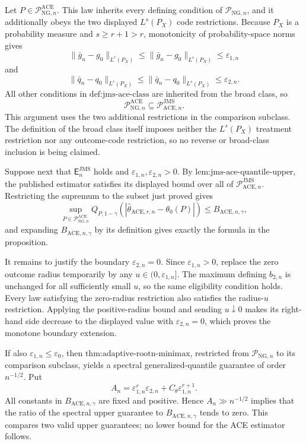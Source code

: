 Let \(P\in\mathcal P_{\mathrm{NG},n}^{\mathrm{ACE}}\).  This law inherits every defining condition of \(\mathcal P_{\mathrm{NG},n}\), and it additionally obeys the two displayed \(L^s(P_X)\) code restrictions.  Because \(P_X\) is a probability measure and \(s\ge r+1>r\), monotonicity of probability-space norms gives
\[
 \|\bar g_n-g_0\|_{L^r(P_X)}
 \le\|\bar g_n-g_0\|_{L^s(P_X)}
 \le\varepsilon_{1,n}
\]
and
\[
 \|\bar q_n-q_0\|_{L^r(P_X)}
 \le\|\bar q_n-q_0\|_{L^s(P_X)}
 \le\varepsilon_{2,n}.
\]
All other conditions in \(\text{def:jms-ace-class}\) are inherited from the broad class, so
\[
 \mathcal P_{\mathrm{NG},n}^{\mathrm{ACE}}
 \subseteq\mathcal P_{\mathrm{ACE},n}^{\mathrm{JMS}}.
\]
This argument uses the two additional restrictions in the comparison subclass.  The definition of the broad class itself imposes neither the \(L^s(P_X)\) treatment restriction nor any outcome-code restriction, so no reverse or broad-class inclusion is being claimed.

Suppose next that \(\mathsf E_n^{\mathrm{JMS}}\) holds and \(\varepsilon_{1,n},\varepsilon_{2,n}>0\).  By \(\text{lem:jms-ace-quantile-upper}\), the published estimator satisfies its displayed bound over all of \(\mathcal P_{\mathrm{ACE},n}^{\mathrm{JMS}}\).  Restricting the supremum to the subset just proved gives
\[
 \sup_{P\in\mathcal P_{\mathrm{NG},n}^{\mathrm{ACE}}}
 Q_{P,1-\gamma}(|\widehat\theta_{\mathrm{ACE},r,n}-\theta_0(P)|)
 \le B_{\mathrm{ACE},n,\gamma},
\]
and expanding \(B_{\mathrm{ACE},n,\gamma}\) by its definition gives exactly the formula in the proposition.

It remains to justify the boundary \(\varepsilon_{2,n}=0\).  Since \(\varepsilon_{1,n}>0\), replace the zero outcome radius temporarily by any \(u\in(0,\varepsilon_{1,n}]\).  The maximum defining \(b_{2,n}\) is unchanged for all sufficiently small \(u\), so the same eligibility condition holds.  Every law satisfying the zero-radius restriction also satisfies the radius-\(u\) restriction.  Applying the positive-radius bound and sending \(u\downarrow0\) makes its right-hand side decrease to the displayed value with \(\varepsilon_{2,n}=0\), which proves the monotone boundary extension.

If also \(\varepsilon_{1,n}\le\varepsilon_0\), then \(\text{thm:adaptive-rootn-minimax}\), restricted from \(\mathcal P_{\mathrm{NG},n}\) to its comparison subclass, yields a spectral generalized-quantile guarantee of order \(n^{-1/2}\).  Put
\[
 A_n=\varepsilon_{1,n}^r\varepsilon_{2,n}
     +C_{\theta}\varepsilon_{1,n}^{r+1}.
\]
All constants in \(B_{\mathrm{ACE},n,\gamma}\) are fixed and positive.  Hence \(A_n\gg n^{-1/2}\) implies that the ratio of the spectral upper guarantee to \(B_{\mathrm{ACE},n,\gamma}\) tends to zero.  This compares two valid upper guarantees; no lower bound for the ACE estimator follows.